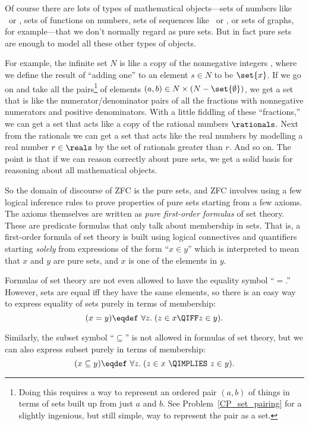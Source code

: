 Of course there are lots of types of mathematical objects---sets of
numbers like \nngint\ or \reals, sets of functions on numbers, sets of
sequences like \finbin\ or \binw, or sets of graphs, for example---that
we don't normally regard as pure sets.  But in fact pure sets are
enough to model all these other types of objects.

For example, the infinite set $N$ is like a copy of the nonnegative
integers \nngint, where we define the result of ``adding one'' to an
element $s \in N$ to be $\set{x}$.  If we go on and take all the
pairs\footnote{Doing this requires a way to represent an ordered pair
  $(a,b)$ of things in terms of sets built up from just $a$ and $b$.
  See Problem~\ref{CP_set_pairing} for a slightly ingenious, but still
  simple, way to represent the pair as a set.}  of elements $(a,b) \in
N \times (N-\set{\emptyset})$, we get a set that is like the
numerator/denominator pairs of all the fractions with nonnegative
numerators and positive denominators.  With a little fiddling of these
``fractions,'' we can get a set that acts like a copy of the rational
numbers $\rationals$.  Next from the rationals we can get a set that
acts like the real numbers by modelling a real number $r \in \reals$
by the set of rationals greater than $r$.  And so on.  The point is
that if we can reason correctly about pure sets, we get a solid basis
for reasoning about all mathematical objects.

So the domain of discourse of ZFC is the pure sets, and ZFC involves
using a few logical inference rules to prove properties of pure sets
starting from a few axioms.  The axioms themselves are written as
\emph{pure first-order formulas} of set theory.
These are predicate formulas that only talk about membership in sets.
That is, a first-order formula of set theory is built using logical
connectives and quantifiers starting \emph{solely} from expressions of
the form ``$x\in y$'' which is interpreted to mean that $x$ and $y$
are pure sets, and $x$ is one of the elements in $y$.

Formulas of set theory are not even allowed to have the equality
symbol ``$=$.''  However, sets are equal iff they have the same
elements, so there is an easy way to express equality of sets purely
in terms of membership:
\begin{equation}\label{xsetequaly}
(x = y) \eqdef\  \forall z.\; (z \in x \QIFF z \in y).
\end{equation}

Similarly, the subset symbol ``$\subseteq$'' is not allowed in
formulas of set theory, but we can also express subset purely in terms
of membership:
\begin{equation}\label{xsubeqy}
(x \subseteq y) \eqdef\ \forall z.\; (z \in x\ \QIMPLIES\ z \in y).
\end{equation}

